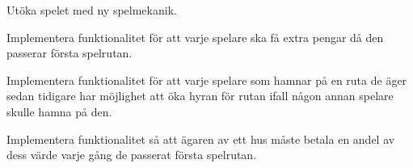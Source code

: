 \Task Utöka spelet med ny spelmekanik.

\Subtask Implementera funktionalitet för att varje spelare ska få extra pengar då den passerar första spelrutan.

\Subtask Implementera funktionalitet för att varje spelare som hamnar på en ruta de äger sedan tidigare har möjlighet att öka hyran för rutan ifall någon annan spelare skulle hamna på den.

\Subtask Implementera funktionalitet så att ägaren av ett hus måste betala en andel av dess värde varje gång de passerat första spelrutan.
    

